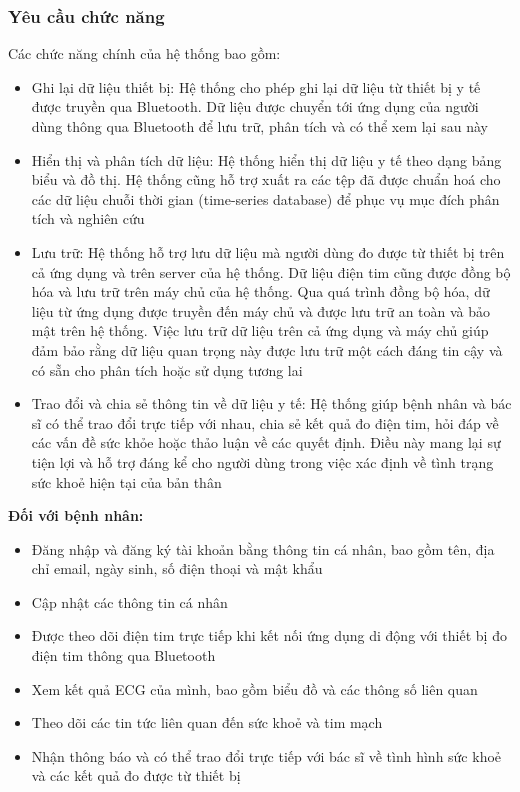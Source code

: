 \subsubsection{Yêu cầu chức năng}
Các chức năng chính của hệ thống bao gồm:
\begin{adjustwidth}{1.5em}{}
  \begin{itemize}
      \item Ghi lại dữ liệu thiết bị: Hệ thống cho phép ghi lại dữ liệu từ thiết bị y tế được truyền qua Bluetooth. Dữ liệu được chuyển tới ứng dụng của người dùng thông qua Bluetooth để lưu trữ, phân tích và có thể xem lại sau này
      \item Hiển thị và phân tích dữ liệu: Hệ thống hiển thị dữ liệu y tế theo dạng bảng biểu và đồ thị. Hệ thống cũng hỗ trợ xuất ra các tệp đã được chuẩn hoá cho các dữ liệu chuỗi thời gian (time-series database) để phục vụ mục đích phân tích và nghiên cứu
      \item Lưu trữ: Hệ thống hỗ trợ lưu dữ liệu mà người dùng đo được từ thiết bị trên cả ứng dụng và trên server của hệ thống. Dữ liệu điện tim cũng được đồng bộ hóa và lưu trữ trên máy chủ của hệ thống. Qua quá trình đồng bộ hóa, dữ liệu từ ứng dụng được truyền đến máy chủ và được lưu trữ an toàn và bảo mật trên hệ thống. Việc lưu trữ dữ liệu trên cả ứng dụng và máy chủ giúp đảm bảo rằng dữ liệu quan trọng này được lưu trữ một cách đáng tin cậy và có sẵn cho phân tích hoặc sử dụng tương lai
      \item Trao đổi và chia sẻ thông tin về dữ liệu y tế: Hệ thống giúp bệnh nhân và bác sĩ có thể trao đổi trực tiếp với nhau, chia sẻ kết quả đo điện tim, hỏi đáp về các vấn đề sức khỏe hoặc thảo luận về các quyết định. Điều này mang lại sự tiện lợi và hỗ trợ đáng kể cho người dùng trong việc xác định về tình trạng sức khoẻ hiện tại của bản thân
  \end{itemize}
\end{adjustwidth}
\textbf{Đối với bệnh nhân:}
\begin{adjustwidth}{1.5em}{}
\begin{itemize}
    \item Đăng nhập và đăng ký tài khoản bằng thông tin cá nhân, bao gồm tên, địa chỉ email, ngày sinh, số điện thoại và mật khẩu
    \item Cập nhật các thông tin cá nhân
    \item Được theo dõi điện tim trực tiếp khi kết nối ứng dụng di động với thiết bị đo điện tim thông qua Bluetooth
    \item Xem kết quả ECG của mình, bao gồm biểu đồ và các thông số liên quan
    \item Theo dõi các tin tức liên quan đến sức khoẻ và tim mạch
    \item Nhận thông báo và có thể trao đổi trực tiếp với bác sĩ về tình hình sức khoẻ và các kết quả đo được từ thiết bị
\end{itemize}
\end{adjustwidth}
